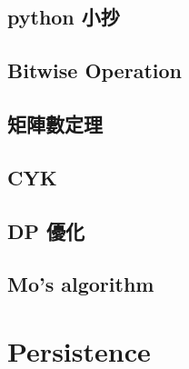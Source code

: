 \subsection{python 小抄}

\subsection{Bitwise Operation}

\subsection{矩陣數定理}

\subsection{CYK}

\subsection{DP 優化}

\subsection{Mo's algorithm}


\section{Persistence}

